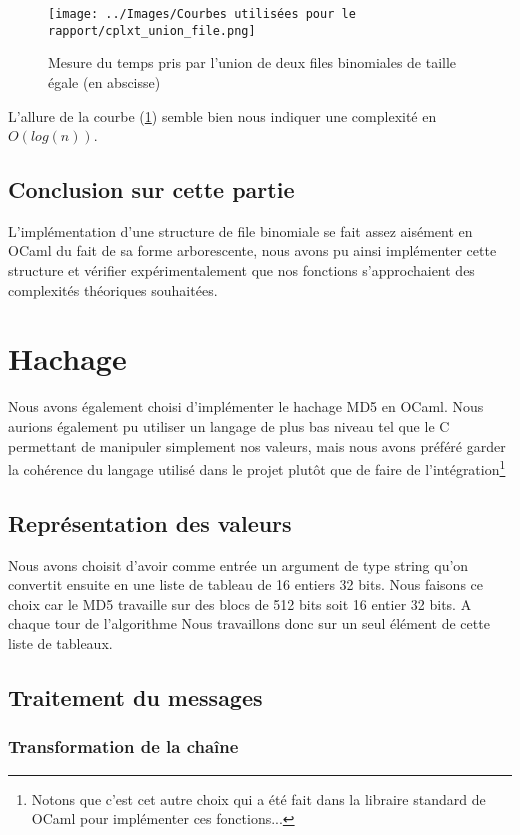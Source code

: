 \documentclass[12pt,a4paper]{article}
\begin{document}
\begin{figure}[hbtp]
\centering
\texttt{[image: ../Images/Courbes utilisées pour le rapport/cplxt\_union\_file.png]}
\caption{Mesure du temps pris par l'union de deux files binomiales de taille égale (en abscisse)}
\label{fig8}
\end{figure}


L'allure de la courbe (\ref{fig8}) semble bien nous indiquer une complexité en $O(log (n))$.


\subsection{Conclusion sur cette partie}

L'implémentation d'une structure de file binomiale se fait assez aisément en OCaml du fait de sa forme arborescente, nous avons pu ainsi implémenter cette structure et vérifier expérimentalement que nos fonctions s'approchaient des complexités théoriques souhaitées.

 \section{Hachage}

    Nous avons également choisi d'implémenter le hachage MD5\cite{md5} en OCaml. Nous aurions également pu utiliser un langage de plus bas niveau tel que le C permettant de manipuler simplement nos valeurs, mais nous avons préféré garder la cohérence du langage utilisé dans le projet plutôt que de faire de l'intégration\footnote{Notons que c'est cet autre choix qui a été fait dans la libraire standard de OCaml pour implémenter ces fonctions...} 

    \subsection{Représentation des valeurs}

    Nous avons choisit d'avoir comme entrée un argument de type string qu'on convertit ensuite en une liste de tableau de 16 entiers 32 bits. 
    Nous faisons ce choix car le MD5 travaille sur des blocs de 512 bits soit 16 entier 32 bits. A chaque tour de l'algorithme Nous travaillons donc sur un seul élément de cette liste de tableaux.

    \subsection{Traitement du messages} 
    \subsubsection{Transformation de la chaîne }
    
\end{document}
